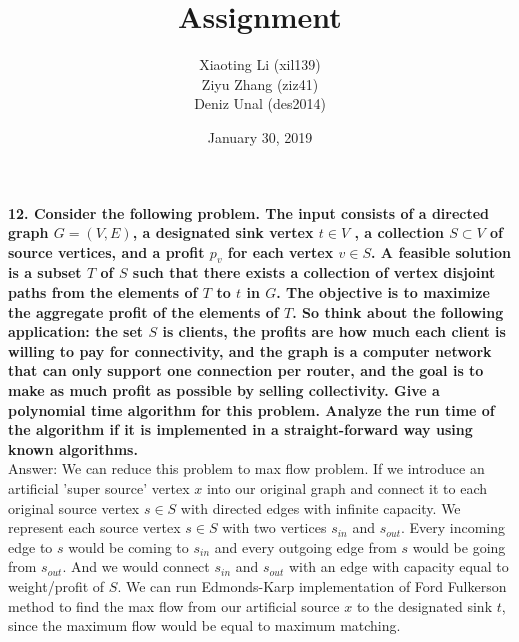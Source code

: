 \documentclass{article}
\title{Assignment }
\author{Xiaoting Li (xil139) \\
Ziyu Zhang (ziz41) \\
Deniz Unal (des2014)}
\date{January 30, 2019}
\begin{document}
\maketitle

\noindent
\textbf{12. Consider the following problem. The input consists of a directed graph $G = (V, E)$, a designated sink vertex $t \in V$ , a collection $S \subset V$ of source vertices, and a profit $p_v$ for each vertex $v \in S$. A feasible solution is a subset $T$ of $S$ such that there exists a collection of vertex disjoint paths from the elements of $T$ to $t$ in $G$. The objective is to maximize the aggregate profit of the elements of $T$. So think about the following application: the set $S$ is clients, the profits are how much each client is willing to pay for connectivity, and the graph is a computer network that can only support one connection per router, and the goal is to make as much profit as possible by selling collectivity. Give a polynomial time algorithm for this problem. Analyze the run time of the algorithm if it is implemented in a straight-forward way using known algorithms.} \\ \newline
\noindent
Answer: We can reduce this problem to max flow problem. If we introduce an artificial 'super source' vertex $x$ into our original graph and connect it to each original source vertex $s \in S$ with  directed edges with infinite capacity. We represent each source vertex $s \in S$ with two vertices $s_{in}$ and $s_{out}$. Every incoming edge to $s$ would be coming to $s_{in}$  and every outgoing edge from $s$ would be going from $s_{out}$. And we would connect $s_{in}$ and $s_{out}$ with an edge with capacity equal to weight/profit of $S$. We can run Edmonds-Karp implementation of Ford Fulkerson method to find the max flow from our artificial source $x$ to the designated sink $t$, since the maximum flow would be equal to maximum matching.
\end{document}
